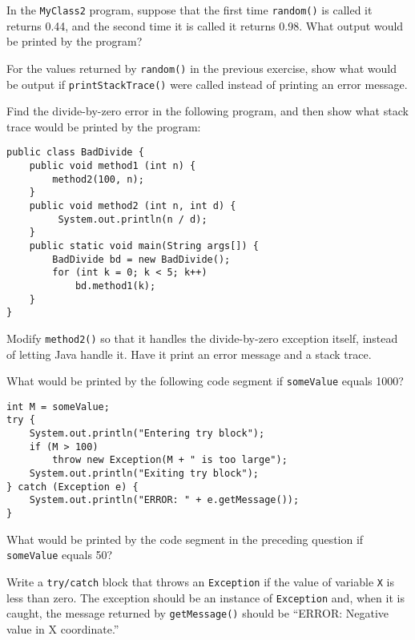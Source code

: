 \begin{SSTUDY}
\item  In the {\tt MyClass2} program, suppose that the first time
{\tt random()} is called it returns 0.44, and the second time it is called
it returns 0.98.  What output would be printed by the program?


\item  For the values returned by {\tt random()} in the previous exercise,
show what would be output if {\tt printStackTrace()} were called
instead of printing an error message.


\item  Find the divide-by-zero error in the following program,
and then show what stack trace would be printed by the
program:

\begin{jjjlisting}
\begin{lstlisting}
public class BadDivide {
    public void method1 (int n) {
        method2(100, n);
    }
    public void method2 (int n, int d) {
         System.out.println(n / d);
    }
    public static void main(String args[]) {
        BadDivide bd = new BadDivide();
        for (int k = 0; k < 5; k++)
            bd.method1(k);
    }
}
\end{lstlisting}
\end{jjjlisting}

\item  Modify {\tt method2()} so that it handles the divide-by-zero
exception itself, instead of letting Java handle it.  Have
it print an error message and a stack trace.


\item  What would be printed by the following
code segment if {\tt someValue} equals 1000?

\begin{jjjlisting}
\begin{lstlisting}
int M = someValue;
try {
    System.out.println("Entering try block");
    if (M > 100)
        throw new Exception(M + " is too large");
    System.out.println("Exiting try block");
} catch (Exception e) {
    System.out.println("ERROR: " + e.getMessage());
}
\end{lstlisting}
\end{jjjlisting}

\item  What would be printed by the code segment in the
preceding question if {\tt someValue} equals 50?


\item  Write a {\tt try/catch} block that throws an
{\tt Exception} if the value of variable {\tt X} is less than zero.
The exception should be an instance of {\tt Exception} and, when
it is caught, the message returned by {\tt getMessage()} should
be ``ERROR: Negative value in X coordinate.''

\end{SSTUDY}


